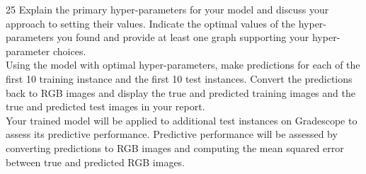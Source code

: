 \documentclass[11pt]{article}
\begin{document}
\begin{problem}{25}
 Explain the primary hyper-parameters for your model and discuss your approach to setting their values. Indicate the optimal values of the hyper-parameters you found and provide at least one graph supporting your hyper-parameter choices.\\

 Using the model with optimal hyper-parameters, make predictions for each of the first 10 training instance and the first 10 test instances. Convert the predictions back to RGB images and display the true and predicted training images and the true and predicted test images in your report.\\

 Your trained model will be applied to additional test instances on Gradescope to assess its predictive performance. Predictive performance will be assessed by converting predictions to RGB images and computing the mean squared error between true and predicted RGB images. 

\end{problem}


\showpoints
\end{document}

